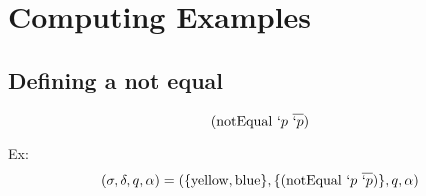 \documentclass[11pt,a4paper]{report}
\newcommand{\var}[1]{`#1}
\newcommand{\unify}{\otimes}
\begin{document}
\begin{comment}
\begin{itemize}
\item $(p_{1} \ldots p_{n}) \unifytuple (q_{1} \ldots q_{n}) = (p_{1} \unifytuple q_{1} \ldots p_{1} \unifytuple q_{n})$
\end{itemize}

\begin{itemize}
\item \textbf{algorithm} Z \textbf{is}
\begin{itemize}
    \item \textbf{input:}
    \subitem $\delta$, a set of definitions,
    \subitem $q$, a query.
    \item \textbf{output:}
    \subitem the awnsers to the query $q$ as a set of tuples.
    \item $\delta_{1} \leftarrow { ([v_{0} \ldots v_{n}]\ p_{0}\ p_{k}): \forall (p_{0} \ldots p_{n}) \in \delta)}$
    \item $Q \rightarrow []$
    \item \textbf{for each} $p$ \textbf{in} $\delta_{1}$ \textbf{do}
    \subitem $q \unify p \leftarrow t$, only evaluate tuple expressions.
    
    \subitem insert $t$ on $Q$ list.
\end{itemize}

\end{itemize}

\end{comment}

\section{Computing Examples}

\subsection{Defining a not equal}

\[
    (\text{notEqual}\ \var{p}\ \overline{\var{p}})
\]

Ex:
\[(\sigma, \delta, q, \alpha ) = (\{\text{yellow}, \text{blue}\}, \{(\text{notEqual}\ \var{p}\ \overline{\var{p}})\}, q, \alpha)\]
\end{document}
